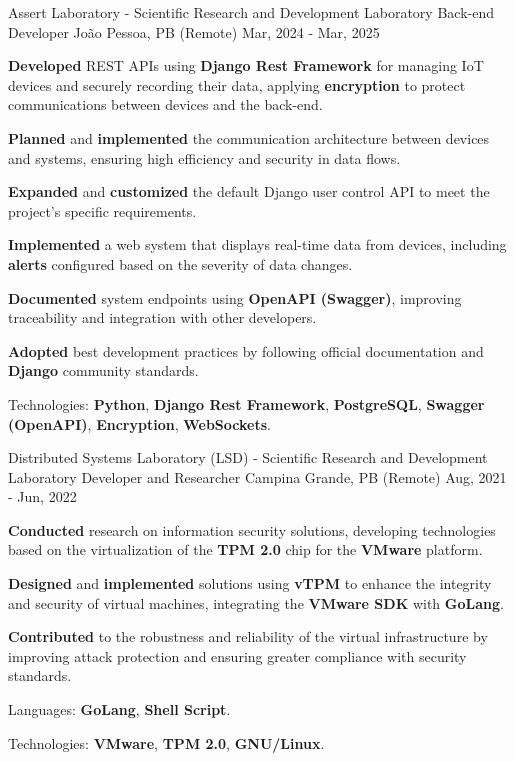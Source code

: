 \begin{cventries}
  \cventry
  {Assert Laboratory - Scientific Research and Development Laboratory} %
  {Back-end Developer} %
  {João Pessoa, PB (Remote)} %
  {Mar, 2024 - Mar, 2025} %
  {
    \begin{cvitems}
      \item {\textbf{Developed} REST APIs using \textbf{Django Rest Framework} for managing IoT devices and securely recording their data, applying \textbf{encryption} to protect communications between devices and the back-end.}
      \item {\textbf{Planned} and \textbf{implemented} the communication architecture between devices and systems, ensuring high efficiency and security in data flows.}
      \item {\textbf{Expanded} and \textbf{customized} the default Django user control API to meet the project’s specific requirements.}
      \item {\textbf{Implemented} a web system that displays real-time data from devices, including \textbf{alerts} configured based on the severity of data changes.}
      \item {\textbf{Documented} system endpoints using \textbf{OpenAPI (Swagger)}, improving traceability and integration with other developers.}
      \item {\textbf{Adopted} best development practices by following official documentation and \textbf{Django} community standards.}
      \item {Technologies: \textbf{Python}, \textbf{Django Rest Framework}, \textbf{PostgreSQL}, \textbf{Swagger (OpenAPI)}, \textbf{Encryption}, \textbf{WebSockets}.}
    \end{cvitems}
  }

  \cventry
  {Distributed Systems Laboratory (LSD) - Scientific Research and Development Laboratory} %
  {Developer and Researcher} %
  {Campina Grande, PB (Remote)} %
  {Aug, 2021 - Jun, 2022} %
  {
    \begin{cvitems}
      \item {\textbf{Conducted} research on information security solutions, developing technologies based on the virtualization of the \textbf{TPM 2.0} chip for the \textbf{VMware} platform.}
      \item {\textbf{Designed} and \textbf{implemented} solutions using \textbf{vTPM} to enhance the integrity and security of virtual machines, integrating the \textbf{VMware SDK} with \textbf{GoLang}.}
      \item {\textbf{Contributed} to the robustness and reliability of the virtual infrastructure by improving attack protection and ensuring greater compliance with security standards.}
      \item {Languages: \textbf{GoLang}, \textbf{Shell Script}.}
      \item {Technologies: \textbf{VMware}, \textbf{TPM 2.0}, \textbf{GNU/Linux}.}
    \end{cvitems}
  }


\end{cventries}
